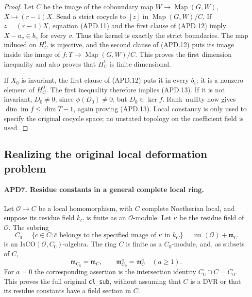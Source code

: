 \begin{proof}
Let \(C\) be the image of the coboundary map
\(W\to\operatorname{Map}(G,W)\), \(X\mapsto(r-1)X\).
Send a strict cocycle to \([z]\) in
\(\operatorname{Map}(G,W)/C\).  If \(z=(r-1)X\), equation
(APD.11) and the first clause of (APD.12) imply
\(X-a_v\in b_v\) for every \(v\).  Thus the kernel is
exactly the strict boundaries.  The map induced on \(H^1_C\)
is injective, and the second clause of (APD.12) puts its image
inside the image of
\(f:T\to\operatorname{Map}(G,W)/C\).
This proves the first dimension inequality and also proves that
\(H^1_C\) is finite dimensional.

If \(X_0\) is invariant, the first clause of (APD.12) puts it
in every \(b_v\); it is a nonzero element of \(H^0_C\).
The first inequality therefore implies (APD.13).  If it is not
invariant, \(D_0\ne0\), since \(\phi(D_0)\ne0\), but
\(D_0\in\ker f\).  Rank--nullity now gives
\(\dim\operatorname{im}f\le\dim T-1\), again proving
(APD.13).  Local constancy is only used to specify the original
cocycle space; no unstated topology on the coefficient field is used.
\end{proof}

\subsection{Realizing the original local deformation problem}

\paragraph{APD7. Residue constants in a general complete local ring.}
\label{claim:APD7}
Let \(\mathcal O\to C\) be a local homomorphism, with \(C\)
complete Noetherian local, and suppose its residue field \(k_C\)
is finite as an \(\mathcal O\)-module.  Let \(\kappa\) be
the residue field of \(\mathcal O\).  The subring
\[
 C_0=\{c\in C:\bar c\text{ belongs to the specified image of }
                         \kappa\text{ in }k_C\}
       =\operatorname{im}(\mathcal O)+\mathfrak m_C          \tag{APD.14}
\]
is an \(\mathrm{IsCO}(\mathcal O,C_0)\)-algebra.  The ring
\(C\) is finite as a \(C_0\)-module, and, as subsets of \(C\),
\[
 \mathfrak m_{C_0}=\mathfrak m_C,\qquad
 \mathfrak m_{C_0}^a=\mathfrak m_C^a\quad(a\ge1).
                                                               \tag{APD.15}
\]
For \(a=0\) the corresponding assertion is the intersection
identity \(C_0\cap C=C_0\).  This proves the full original
\texttt{cl\_sub}, without assuming that \(C\) is a DVR or that
its residue constants have a field section in \(C\).

